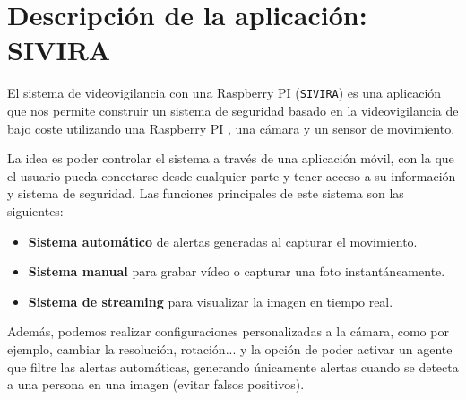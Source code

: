 


\pagestyle{miEstilo5}

\section{Descripción de la aplicación: SIVIRA}

El sistema de videovigilancia con una Raspberry PI (\texttt{SIVIRA}) es una aplicación que nos permite construir un sistema de seguridad basado en la videovigilancia de bajo coste utilizando una Raspberry PI , una cámara y un sensor de movimiento.

La idea es poder controlar el sistema a través de una aplicación móvil, con la que el usuario pueda conectarse desde cualquier parte y tener acceso a su información y sistema de seguridad. Las funciones principales de este sistema son las siguientes:

\begin{itemize}
\item \textbf{Sistema automático} de alertas generadas al capturar el movimiento.
\item \textbf{Sistema manual} para grabar vídeo o capturar una foto instantáneamente.   
\item \textbf{Sistema de streaming} para visualizar la imagen en tiempo real.
\end{itemize}

Además, podemos realizar configuraciones personalizadas a la cámara, como por ejemplo, cambiar la resolución, rotación... y la opción de poder activar un agente que filtre las alertas automáticas, generando únicamente alertas cuando se detecta a una persona en una imagen (evitar falsos positivos).











